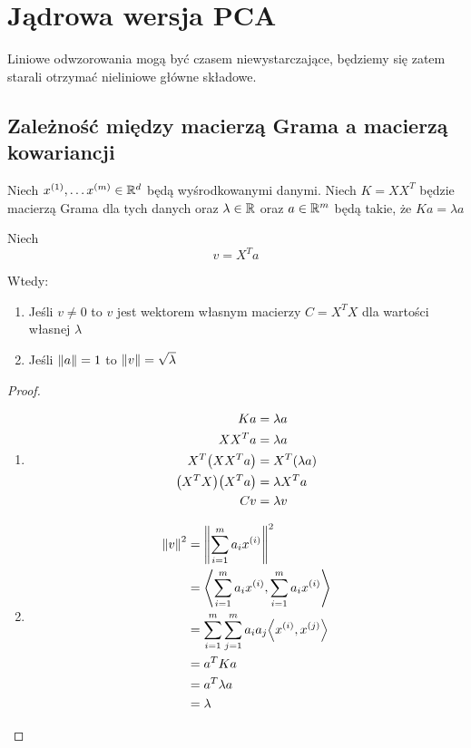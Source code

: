 \section{Jądrowa wersja PCA}

Liniowe odwzorowania mogą być czasem niewystarczające, będziemy się zatem starali otrzymać nieliniowe główne składowe.

\subsection{Zależność między macierzą Grama a macierzą kowariancji}

\begin{lemma}
	Niech \( x^{(1)}, \dots x^{(m)} \in \mathbb{R}^d \) będą wyśrodkowanymi danymi.
	Niech \( K = XX^T \) będzie macierzą Grama dla tych danych
	oraz \( \lambda \in  \mathbb{R} \) oraz \( a \in \mathbb{R}^m \) będą takie, że \( Ka = \lambda a \)

	Niech
	\[
		v = X^Ta
	\]

	Wtedy:
	\begin{enumerate}
		\item Jeśli \( v \neq 0 \) to \( v \) jest wektorem własnym macierzy \( C = X^TX \) dla wartości własnej \( \lambda \)
		\item Jeśli \( \left\Vert a \right\Vert = 1 \) to \( \left\Vert v \right\Vert = \sqrt{\lambda} \)
	\end{enumerate}
\end{lemma}
\begin{proof} \( \)

	\begin{enumerate}
		\item
		      \begin{align*}
			      Ka                     & = \lambda a            \\
			      XX^Ta                  & = \lambda a            \\
			      X^T\pars{XX^Ta}        & = X^T \pars{\lambda a} \\
			      \pars{X^TX}\pars{X^Ta} & = \lambda X^T a        \\
			      Cv                     & = \lambda v
		      \end{align*}

		\item
		      \begin{align*}
			      \norm{v}^2
			       & = \norm{\sum_{i=1}^m a_i x^{(i)}}^2                               \\
			       & = \dotproduct{\sum_{i=1}^m a_i x^{(i)}, \sum_{i=1}^m a_i x^{(i)}} \\
			       & = \sum_{i=1}^m \sum_{j=1}^m a_i a_j\dotproduct{x^{(i)}, x^{(j)}}  \\
			       & = a^TKa                                                           \\
			       & = a^T\lambda a                                                    \\
			       & = \lambda
		      \end{align*}

	\end{enumerate}
\end{proof}

